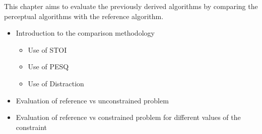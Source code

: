 This chapter aims to evaluate the previously derived algorithms by comparing the perceptual algorithms
with the reference algorithm.
\begin{itemize}
    \item Introduction to the comparison methodology
        \begin{itemize}
            \item Use of STOI
            \item Use of PESQ 
            \item Use of Distraction
        \end{itemize}
    \item Evaluation of reference vs unconstrained problem
    \item Evaluation of reference vs constrained problem for different values of the constraint
\end{itemize}

